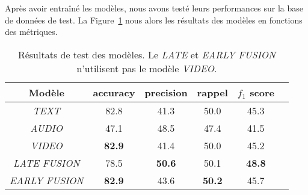 Après avoir entraîné les modèles, nous avons testé leurs performances sur la base de données de test.
La Figure~\ref{tab: test} nous alors les résultats des modèles en fonctions des métriques.

\begin{table}[H]
    \centering
    \begin{tabular}{|c|c|c|c|c|c|}
        \hline
        Modèle & accuracy & precision & rappel & $f_1$ score\\
        \hline
        \textit{TEXT} & 82.8 & 41.3 & 50.0 & 45.3\\
        \hline
        \textit{AUDIO} & 47.1 & 48.5 & 47.4 & 41.5\\
        \hline
        \textit{VIDEO} & \textbf{82.9} & 41.4 & 50.0 & 45.2\\
        \hline
        \textit{LATE FUSION} & 78.5 & \textbf{50.6} & 50.1 & \textbf{48.8}\\
        \hline
        \textit{EARLY FUSION} & \textbf{82.9} & 43.6 & \textbf{50.2} & 45.7\\
        \hline
    \end{tabular}
    \caption{Résultats de test des modèles. Le \textit{LATE} et \textit{EARLY FUSION} n'utilisent pas le modèle \textit{VIDEO}.}
    \label{tab: test}
\end{table}